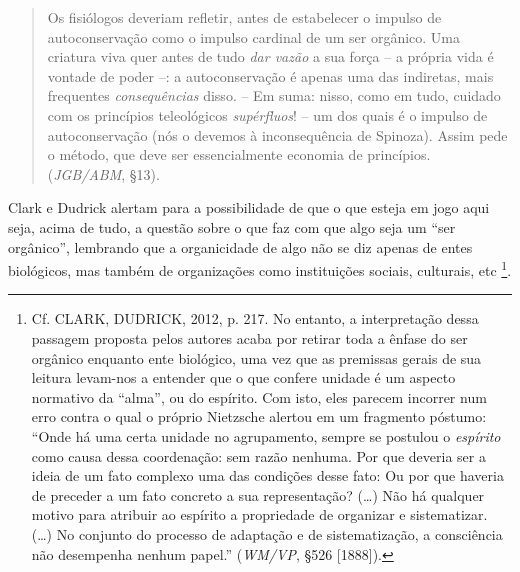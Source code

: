 \documentclass[
	12pt,				%
	openright,			%
	oneside,			%
	a4paper,			%
	english,			%
	french,				%
	spanish,			%
	brazil				%
	]{abntex2}
\begin{document}
\begin{quotation}
Os fisiólogos deveriam refletir, antes de estabelecer o impulso de autoconservação como o impulso cardinal de um ser orgânico. Uma criatura viva quer antes de tudo \textit{dar vazão} a sua força – a própria vida é vontade de poder –: a autoconservação é apenas uma das indiretas, mais frequentes \textit{consequências} disso. – Em suma: nisso, como em tudo, cuidado com os princípios teleológicos \textit{supérfluos}! – um dos quais é o impulso de autoconservação (nós o devemos à inconsequência de Spinoza). Assim pede o método, que deve ser essencialmente economia de princípios. (\textit{JGB/ABM}, §13).
\end{quotation}

Clark e Dudrick alertam para a possibilidade de que o que esteja em jogo aqui seja, acima de tudo, a questão sobre o que faz com que algo seja um “ser orgânico”, lembrando que a organicidade de algo não se diz apenas de entes biológicos, mas também de organizações como instituições sociais, culturais, etc
\footnote{Cf. CLARK, DUDRICK, 2012, p. 217. No entanto, a interpretação dessa passagem proposta pelos autores acaba por retirar toda a ênfase do ser orgânico enquanto ente biológico, uma vez que as premissas gerais de sua leitura levam-nos a entender que o que confere unidade é um aspecto normativo da “alma”, ou do espírito. Com isto, eles parecem incorrer num erro contra o qual o próprio Nietzsche alertou em um fragmento póstumo: “Onde há uma certa unidade no agrupamento, sempre se postulou o \textit{espírito} como causa dessa coordenação: sem razão nenhuma. Por que deveria ser a ideia de um fato complexo uma das condições desse fato: Ou por que haveria de preceder a um fato concreto a sua representação? (…) Não há qualquer motivo para atribuir ao espírito a propriedade de organizar e sistematizar. (…) No conjunto do processo de adaptação e de sistematização, a consciência não desempenha nenhum papel.” (\textit{WM/VP}, §526 [1888]).}. 
\end{document}
